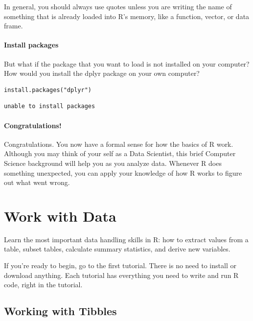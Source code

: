 \documentclass[
]{article}
\begin{document}
In general, you should always use quotes unless you are writing the name
of something that is already loaded into R's memory, like a function,
vector, or data frame.

\hypertarget{install-packages}{%
\paragraph{Install packages}\label{install-packages}}

But what if the package that you want to load is not installed on your
computer? How would you install the dplyr package on your own computer?

\begin{verbatim}
install.packages("dplyr")
\end{verbatim}

\begin{verbatim}
unable to install packages
\end{verbatim}

\hypertarget{congratulations}{%
\paragraph{Congratulations!}\label{congratulations}}

Congratulations. You now have a formal sense for how the basics of R
work. Although you may think of your self as a Data Scientist, this
brief Computer Science background will help you as you analyze data.
Whenever R does something unexpected, you can apply your knowledge of
how R works to figure out what went wrong.

\hypertarget{work-with-data}{%
\section{Work with Data}\label{work-with-data}}

Learn the most important data handling skills in R: how to extract
values from a table, subset tables, calculate summary statistics, and
derive new variables.

If you're ready to begin, go to the first tutorial. There is no need to
install or download anything. Each tutorial has everything you need to
write and run R code, right in the tutorial.

\hypertarget{working-with-tibbles}{%
\subsection{Working with Tibbles}\label{working-with-tibbles}}
\end{document}
